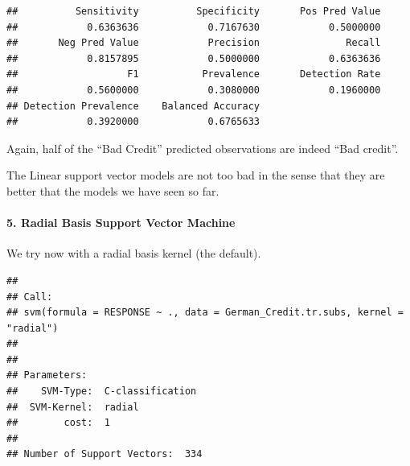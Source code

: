 \documentclass[
]{article}
\begin{document}
\begin{verbatim}
##          Sensitivity          Specificity       Pos Pred Value 
##            0.6363636            0.7167630            0.5000000 
##       Neg Pred Value            Precision               Recall 
##            0.8157895            0.5000000            0.6363636 
##                   F1           Prevalence       Detection Rate 
##            0.5600000            0.3080000            0.1960000 
## Detection Prevalence    Balanced Accuracy 
##            0.3920000            0.6765633
\end{verbatim}

Again, half of the ``Bad Credit'' predicted observations are indeed
``Bad credit''.

The Linear support vector models are not too bad in the sense that they
are better that the models we have seen so far.

\hypertarget{radial-basis-support-vector-machine}{%
\paragraph{5. Radial Basis Support Vector
Machine}\label{radial-basis-support-vector-machine}}

We try now with a radial basis kernel (the default).

\begin{verbatim}
## 
## Call:
## svm(formula = RESPONSE ~ ., data = German_Credit.tr.subs, kernel = "radial")
## 
## 
## Parameters:
##    SVM-Type:  C-classification 
##  SVM-Kernel:  radial 
##        cost:  1 
## 
## Number of Support Vectors:  334
\end{verbatim}
\end{document}
